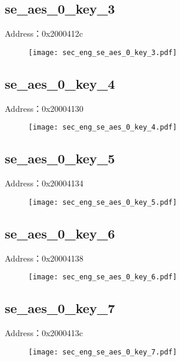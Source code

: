 \subsection{se\_aes\_0\_key\_3}
\label{sec_eng-se-aes-0-key-3}
Address：0x2000412c
 \begin{figure}[H]
\texttt{[image: sec\_eng\_se\_aes\_0\_key\_3.pdf]}
\end{figure}

\subsection{se\_aes\_0\_key\_4}
\label{sec_eng-se-aes-0-key-4}
Address：0x20004130
 \begin{figure}[H]
\texttt{[image: sec\_eng\_se\_aes\_0\_key\_4.pdf]}
\end{figure}

\subsection{se\_aes\_0\_key\_5}
\label{sec_eng-se-aes-0-key-5}
Address：0x20004134
 \begin{figure}[H]
\texttt{[image: sec\_eng\_se\_aes\_0\_key\_5.pdf]}
\end{figure}

\subsection{se\_aes\_0\_key\_6}
\label{sec_eng-se-aes-0-key-6}
Address：0x20004138
 \begin{figure}[H]
\texttt{[image: sec\_eng\_se\_aes\_0\_key\_6.pdf]}
\end{figure}

\subsection{se\_aes\_0\_key\_7}
\label{sec_eng-se-aes-0-key-7}
Address：0x2000413c
 \begin{figure}[H]
\texttt{[image: sec\_eng\_se\_aes\_0\_key\_7.pdf]}
\end{figure}

